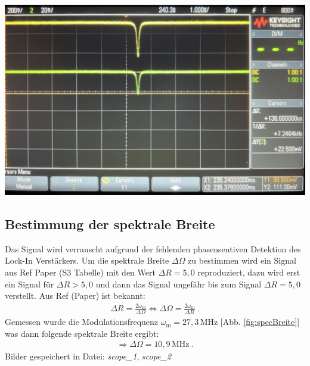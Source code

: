 \begin{center}
    \captionsetup{type=figure}
    \includegraphics[scale=0.2]{Bilder/Signal-Rausch/signal-rausch_od.jpg}
    \label{fig:opDichte}
\end{center}

\subsection{Bestimmung der spektrale Breite}
\label{sub:specBreite}

Das Signal wird verrauscht aufgrund der fehlenden phasensentiven Detektion des Lock-In Verstärkers. Um die spektrale Breite $\Delta \Omega$ zu bestimmen wird ein Signal aus Ref Paper (S3 Tabelle) mit den Wert $\Delta R = 5,0$ reproduziert, dazu wird erst ein Signal für $\Delta R > 5,0$ und dann das Signal ungefähr bis zum Signal  $\Delta R = 5,0$ verstellt. Aus Ref (Paper) ist bekannt:
\begin{gather}
    \Delta R = \frac{2 \omega_\mathrm{m}}{\Delta \Omega} \Leftrightarrow \Delta \Omega = \frac{2 \omega_\mathrm{m}}{\Delta R}~.
\end{gather}
Gemessen wurde die Modulationsfrequenz $\omega_\mathrm{m} = 27,3$\,MHz [Abb. \ref{fig:specBreite}] was dann folgende spektrale Breite ergibt: 
\begin{gather}    
    \Rightarrow \boxed{\Delta \Omega = 10,9\,\mathrm{MHz}}~.
\end{gather}
Bilder gespeichert in Datei: \textit{scope\_1}, \textit{scope\_2}

